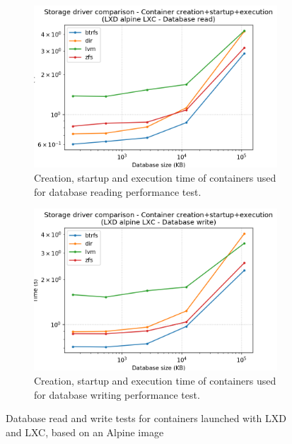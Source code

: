 \begin{figure}[h!]
    \begin{subfigure}{.5\textwidth}
      \centering
      \includegraphics[width=\linewidth]{images/storage-driver/storage-driver-full-LXD-alpine-LXC---Database-read.png}
      \caption{Creation, startup and execution time of containers used for database reading performance test.}
      \label{fig:storage-driver:lxc:db-read-full}
    \end{subfigure}
    \begin{subfigure}{.5\textwidth}
      \centering
      \includegraphics[width=\linewidth]{images/storage-driver/storage-driver-full-LXD-alpine-LXC---Database-write.png}
      \caption{Creation, startup and execution time of containers used for database writing performance test.}
      \label{fig:storage-driver:lxc:db-write-full}
    \end{subfigure}
    
    \caption{Database read and write tests for containers launched with LXD and LXC, based on an Alpine image}
    \label{fig:storage-driver:lxc:db}
\end{figure}

